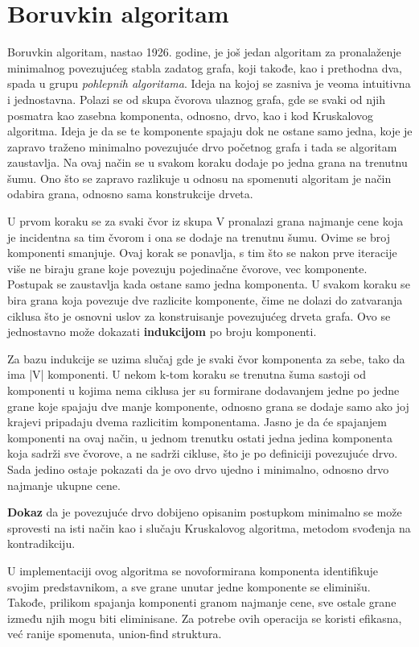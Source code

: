 \documentclass[12pt,oneside]{memoir}
\begin{document}
\section{Boruvkin algoritam}
Boruvkin algoritam, nastao 1926. godine, je još jedan algoritam za pronalaženje minimalnog povezujućeg stabla zadatog grafa, koji takođe, kao i prethodna dva, spada u grupu \textit{pohlepnih algoritama}. Ideja na kojoj se zasniva je veoma intuitivna i jednostavna. Polazi se od skupa čvorova ulaznog grafa, gde se svaki od njih posmatra kao zasebna komponenta, odnosno, drvo, kao i kod Kruskalovog algoritma. Ideja je da se te komponente spajaju dok ne ostane samo jedna, koje je zapravo traženo minimalno povezujuće drvo početnog grafa i tada se algoritam zaustavlja. Na ovaj način se u svakom koraku dodaje po jedna grana na trenutnu šumu. Ono što se zapravo razlikuje u odnosu na spomenuti algoritam je način odabira grana, odnosno sama konstrukcije drveta.

U prvom koraku se za svaki čvor iz skupa V pronalazi grana najmanje cene koja je incidentna sa tim čvorom i ona se dodaje na trenutnu šumu. Ovime se broj komponenti smanjuje. Ovaj korak se ponavlja, s tim što se nakon prve iteracije više ne biraju grane koje povezuju pojedinačne čvorove, vec komponente. Postupak se zaustavlja kada ostane samo jedna komponenta. U svakom koraku se bira grana koja povezuje dve razlicite komponente, čime ne dolazi do zatvaranja ciklusa što je osnovni uslov za konstruisanje povezujućeg drveta grafa. Ovo se jednostavno može dokazati \textbf{indukcijom} po broju komponenti.

Za bazu indukcije se uzima slučaj gde je svaki čvor komponenta za sebe, tako da ima |V| komponenti. U nekom k-tom koraku se trenutna šuma sastoji od komponenti u kojima nema ciklusa jer su formirane dodavanjem jedne po jedne grane koje spajaju dve manje komponente, odnosno grana se dodaje samo ako joj krajevi pripadaju dvema razlicitim komponentama. Jasno je da će spajanjem komponenti na ovaj način, u jednom trenutku ostati jedna jedina komponenta koja sadrži sve čvorove, a ne sadrži cikluse, što je po definiciji povezujuće drvo. Sada jedino ostaje pokazati da je ovo drvo ujedno i minimalno, odnosno drvo najmanje ukupne cene.

\textbf{Dokaz} da je povezujuće drvo dobijeno opisanim postupkom minimalno se može sprovesti na isti način kao i slučaju Kruskalovog algoritma, metodom svođenja na kontradikciju.

U implementaciji ovog algoritma se novoformirana komponenta identifikuje svojim predstavnikom, a sve grane unutar jedne komponente se eliminišu. Takođe, prilikom spajanja komponenti granom najmanje cene, sve ostale grane između njih mogu biti eliminisane. Za potrebe ovih operacija se koristi efikasna, već ranije spomenuta, union-find struktura. 
\end{document}
